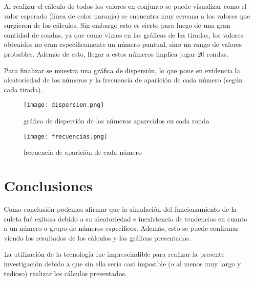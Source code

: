 Al realizar el cálculo de todos los valores en conjunto se puede visualizar como el valor esperado (línea de color naranja) se encuentra muy cercana a los valores que surgieron de los cálculos. Sin embargo esto es cierto para luego de una gran cantidad de rondas, ya que como vimos en las gráficas de las tiradas, los valores obtenidos no eran específicamente un número puntual, sino un rango de valores probables. Además de esto, llegar a estos números implica jugar 20 rondas.

Para finalizar se muestra una gráfica de dispersión, lo que pone en evidencia la aleatoriedad de los números y la frecuencia de aparición de cada número (según cada tirada).
\begin{figure}[H]
  \centering
  \texttt{[image: dispersion.png]}
  \label{fig:dispersion}
  \caption{gráfica de dispersión de los números aparecidos en cada ronda}
\end{figure}
\begin{figure}[H]
  \centering
  \texttt{[image: frecuencias.png]}
  \label{fig:frecuencias}
  \caption{frecuencia de aparición de cada número}
\end{figure}

\section{Conclusiones}
Como conclusión podemos afirmar que la simulación del funcionamiento de la ruleta fué exitosa debido a su aleatoriedad e inexistencia de tendencias en cuanto a un número o grupo de números específicos. Además, esto se puede confirmar viendo los resultados de los cálculos y las gráficas presentadas.

La utilización de la tecnología fue imprescindible para realizar la presente investigación debido a que sin ella sería casi imposible (o al menos muy largo y tedioso) realizar los cálculos presentados.

\nocite{*}  %
  


